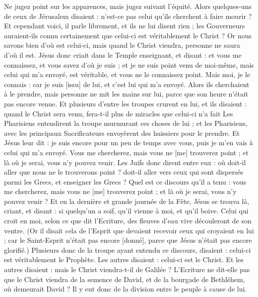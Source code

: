 \begin{multicols}{2}
Ne jugez point sur les apparences, mais jugez suivant l'équité.
Alors quelques-uns de ceux de Jérusalem disaient : n'est-ce pas celui qu'ils cherchent à faire mourir ?
Et cependant voici, il parle librement, et ils ne lui disent rien ; les Gouverneurs auraient-ils connu certainement que celui-ci est véritablement le Christ ?
Or nous savons bien d'où est celui-ci, mais quand le Christ viendra, personne ne saura d'où il est.
Jésus donc criait dans le Temple enseignant, et disant : et vous me connaissez, et vous savez d'où je suis ; et je ne suis point venu de moi-même, mais celui qui m'a envoyé, est véritable, et vous ne le connaissez point.
Mais moi, je le connais : car je suis [issu] de lui, et c'est lui qui m'a envoyé.
Alors ils cherchaient à le prendre, mais personne ne mit les mains sur lui, parce que son heure n'était pas encore venue.
Et plusieurs d'entre les troupes crurent en lui, et ils disaient : quand le Christ sera venu, fera-t-il plus de miracles que celui-ci n'a fait
Les Pharisiens entendirent la troupe murmurant ces choses de lui ; et les Pharisiens, avec les principaux Sacrificateurs envoyèrent des huissiers pour le prendre.
Et Jésus leur dit : je suis encore pour un peu de temps avec vous, puis je m'en vais à celui qui m'a envoyé.
Vous me chercherez, mais vous ne [me] trouverez point ; et là où je serai, vous n'y pouvez venir.
Les Juifs donc dirent entre eux : où doit-il aller que nous ne le trouverons point ? doit-il aller vers ceux qui sont dispersés parmi les Grecs, et enseigner les Grecs ?
Quel est ce discours qu'il a tenu : vous me chercherez, mais vous ne [me] trouverez point ; et là où je serai, vous n'y pouvez venir ?
Et en la dernière et grande journée de la Fête, Jésus se trouva là, criant, et disant : si quelqu'un a soif, qu'il vienne à moi, et qu'il boive.
Celui qui croit en moi, selon ce que dit l'Ecriture, des fleuves d'eau vive découleront de son ventre.
(Or il disait cela de l'Esprit que devaient recevoir ceux qui croyaient en lui ; car le Saint-Esprit n'était pas encore [donné], parce que Jésus n'était pas encore glorifié.)
Plusieurs donc de la troupe ayant entendu ce discours, disaient : celui-ci est véritablement le Prophète.
Les autres disaient : celui-ci est le Christ. Et les autres disaient : mais le Christ viendra-t-il de Galilée ?
L'Ecriture ne dit-elle pas que le Christ viendra de la semence de David, et de la bourgade de Bethléhem, où demeurait David ?
Il y eut donc de la division entre le peuple à cause de lui.

\end{multicols}
